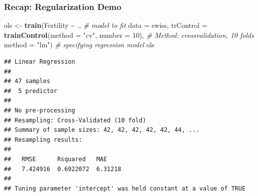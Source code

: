 \documentclass[
  shownotes,
  xcolor={svgnames},
  hyperref={colorlinks,citecolor=DarkBlue,linkcolor=DarkRed,urlcolor=DarkBlue}
  , aspectratio=169]{beamer}
\newenvironment{Shaded}{\begin{snugshade}}{\end{snugshade}}
\newcommand{\CommentTok}[1]{\textcolor[rgb]{0.56,0.35,0.01}{\textit{#1}}}
\newcommand{\DataTypeTok}[1]{\textcolor[rgb]{0.13,0.29,0.53}{#1}}
\newcommand{\DecValTok}[1]{\textcolor[rgb]{0.00,0.00,0.81}{#1}}
\newcommand{\KeywordTok}[1]{\textcolor[rgb]{0.13,0.29,0.53}{\textbf{#1}}}
\newcommand{\NormalTok}[1]{#1}
\newcommand{\OperatorTok}[1]{\textcolor[rgb]{0.81,0.36,0.00}{\textbf{#1}}}
\newcommand{\StringTok}[1]{\textcolor[rgb]{0.31,0.60,0.02}{#1}}
\begin{document}
\begin{frame}[fragile]
\frametitle{Recap: Regularization Demo}

\begin{scriptsize}
\begin{Shaded}
\begin{Highlighting}[]
\NormalTok{ols \textless{}{-}}\StringTok{ }\KeywordTok{train}\NormalTok{(Fertility }\OperatorTok{\textasciitilde{}}\StringTok{ }\NormalTok{.,   }\CommentTok{\# model to fit}
                     \DataTypeTok{data =}\NormalTok{ swiss,                        }
                     \DataTypeTok{trControl =} \KeywordTok{trainControl}\NormalTok{(}\DataTypeTok{method =} \StringTok{"cv"}\NormalTok{, }\DataTypeTok{number =} \DecValTok{10}\NormalTok{),     }\CommentTok{\# Method: crossvalidation, 10 folds}
                     \DataTypeTok{method =} \StringTok{"lm"}\NormalTok{)                      }\CommentTok{\# specifying regression model}
\NormalTok{ols}
\end{Highlighting}
\end{Shaded}
\end{scriptsize}
\begin{tiny}
\begin{verbatim}
## Linear Regression 
## 
## 47 samples
##  5 predictor
## 
## No pre-processing
## Resampling: Cross-Validated (10 fold) 
## Summary of sample sizes: 42, 42, 42, 42, 42, 44, ... 
## Resampling results:
## 
##   RMSE      Rsquared   MAE    
##   7.424916  0.6922072  6.31218
## 
## Tuning parameter 'intercept' was held constant at a value of TRUE
\end{verbatim}
\end{tiny}
\end{frame}
\end{document}
